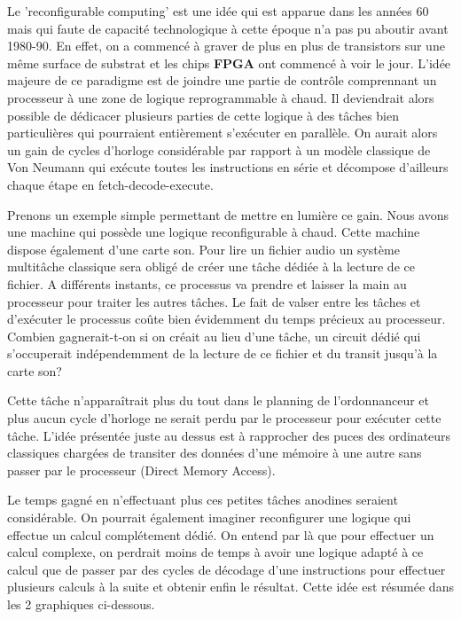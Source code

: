 Le 'reconfigurable computing' est une idée qui est apparue dans les années 60 \cite{RECOMPUT_WIKI} mais
qui faute de capacité technologique à cette époque n'a pas pu aboutir avant 1980-90.
En effet, on a commencé à graver de plus en plus de transistors sur une même surface
de substrat et les chips {\bf FPGA} ont commencé à voir le jour.  L'idée majeure de
ce paradigme est de joindre une partie de contrôle comprennant un processeur à une
zone de logique reprogrammable à chaud. Il deviendrait alors possible de dédicacer
plusieurs parties de cette logique à des tâches bien particulières qui pourraient
entièrement s’exécuter en parallèle. On aurait alors un gain de cycles d'horloge
considérable par rapport à un modèle classique de Von Neumann \cite{NEUMANN} qui exécute toutes les
instructions en série et décompose d'ailleurs chaque étape en fetch-decode-execute.

Prenons un exemple simple permettant de mettre en lumière ce gain. Nous avons une
machine qui possède une logique reconfigurable à chaud. Cette machine dispose
également d'une carte son. Pour lire un fichier audio un système multitâche classique
sera obligé de créer une tâche dédiée à la lecture de ce fichier. A différents
instants, ce processus va prendre et laisser la main au processeur pour traiter les
autres tâches. Le fait de valser entre les tâches et d'exécuter le processus coûte
bien évidemment du temps précieux au processeur. Combien gagnerait-t-on si on créait
au lieu d'une tâche, un circuit dédié qui s'occuperait indépendemment de la lecture
de ce fichier et du transit jusqu'à la carte son?

Cette tâche n'apparaîtrait plus du tout dans le planning de l'ordonnanceur et plus
aucun cycle d'horloge ne serait perdu par le processeur pour exécuter cette tâche.
L'idée présentée juste au dessus est à rapprocher des puces des ordinateurs
classiques chargées de transiter des données d'une mémoire à une autre sans passer
par le processeur (Direct Memory Access).

Le temps gagné en n'effectuant plus ces petites tâches anodines seraient
considérable. On pourrait également imaginer reconfigurer une logique qui effectue un
calcul complétement dédié. On entend par là que pour effectuer un calcul complexe, on
perdrait moins de temps à avoir une logique adapté à ce calcul que de passer par des
cycles de décodage d'une instructions pour effectuer plusieurs calculs à la suite et
obtenir enfin le résultat. Cette idée est résumée dans les 2 graphiques ci-dessous.

